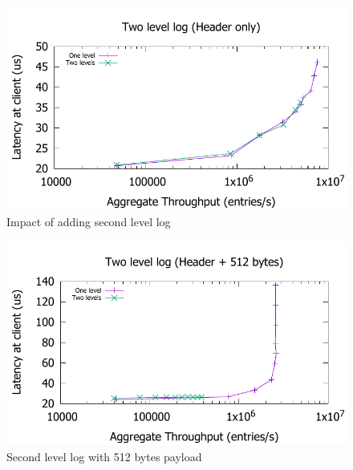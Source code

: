 \documentclass[10pt, preprint, nonatbib]{sigplanconf}
\begin{document}
\begin{figure}
\includegraphics[scale=0.6]{results2/flashlog.pdf}
\caption{Impact of adding second level log}
\label{fig:flashlog}
\end{figure}

\begin{figure}
\includegraphics[scale=0.6]{results2/flashlog_512.pdf}
\caption{Second level log with 512 bytes payload}
\label{fig:flashlog_512}
\end{figure}
\end{document}
